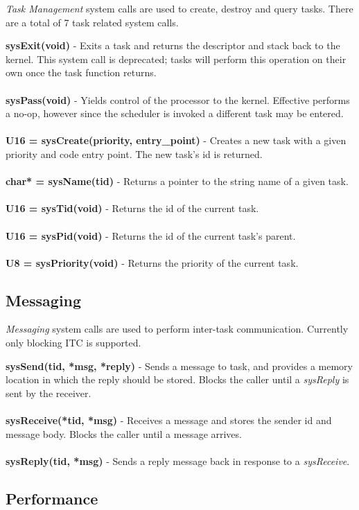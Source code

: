 \documentclass[twoside,a4paper]{refart}
\begin{document}
\textit{Task Management} system calls are used to create, destroy and query tasks. There are a total of 7 task related system calls.

\textbf{sysExit(void)} - Exits a task and returns the descriptor and stack back to the kernel. This system call is deprecated; tasks will perform this operation on their own once the task function returns.\\\\
\textbf{sysPass(void)} - Yields control of the processor to the kernel. Effective performs a no-op, however since the scheduler is invoked a different task may be entered.\\\\
\textbf{U16 = sysCreate(priority, entry\_point)} - Creates a new task with a given priority and code entry point. The new task's id is returned.\\\\
\textbf{char* = sysName(tid)} - Returns a pointer to the string name of a given task.\\\\
\textbf{U16 = sysTid(void)} - Returns the id of the current task.\\\\
\textbf{U16 = sysPid(void)} - Returns the id of the current task's parent.\\\\
\textbf{U8 = sysPriority(void)} - Returns the priority of the current task.

\subsection{Messaging}

\textit{Messaging} system calls are used to perform inter-task communication. Currently only blocking ITC is supported.

\textbf{sysSend(tid, *msg, *reply)} - Sends a message to task, and provides a memory location in which the reply should be stored. Blocks the caller until a \textit{sysReply} is sent by the receiver.\\\\
\textbf{sysReceive(*tid, *msg)} - Receives a message and stores the sender id and message body. Blocks the caller until a message arrives.\\\\
\textbf{sysReply(tid, *msg)} - Sends a reply message back in response to a \textit{sysReceive}.

\subsection{Performance}
\end{document}
